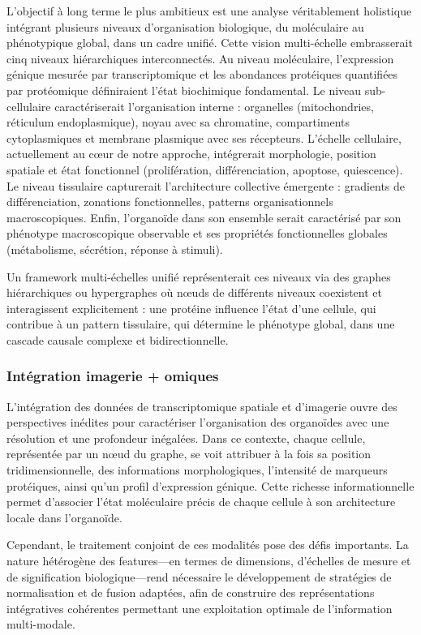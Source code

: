 L'objectif à long terme le plus ambitieux est une analyse véritablement holistique intégrant plusieurs niveaux d'organisation biologique, du moléculaire au phénotypique global, dans un cadre unifié. Cette vision multi-échelle embrasserait cinq niveaux hiérarchiques interconnectés. Au niveau moléculaire, l'expression génique mesurée par transcriptomique et les abondances protéiques quantifiées par protéomique définiraient l'état biochimique fondamental. Le niveau sub-cellulaire caractériserait l'organisation interne : organelles (mitochondries, réticulum endoplasmique), noyau avec sa chromatine, compartiments cytoplasmiques et membrane plasmique avec ses récepteurs. L'échelle cellulaire, actuellement au cœur de notre approche, intégrerait morphologie, position spatiale et état fonctionnel (prolifération, différenciation, apoptose, quiescence). Le niveau tissulaire capturerait l'architecture collective émergente : gradients de différenciation, zonations fonctionnelles, patterns organisationnels macroscopiques. Enfin, l'organoïde dans son ensemble serait caractérisé par son phénotype macroscopique observable et ses propriétés fonctionnelles globales (métabolisme, sécrétion, réponse à stimuli).

Un framework multi-échelles unifié représenterait ces niveaux via des graphes hiérarchiques ou hypergraphes où nœuds de différents niveaux coexistent et interagissent explicitement : une protéine influence l'état d'une cellule, qui contribue à un pattern tissulaire, qui détermine le phénotype global, dans une cascade causale complexe et bidirectionnelle.

\subsubsection{Intégration imagerie + omiques}

L'intégration des données de transcriptomique spatiale et d'imagerie ouvre des perspectives inédites pour caractériser l'organisation des organoïdes avec une résolution et une profondeur inégalées. Dans ce contexte, chaque cellule, représentée par un nœud du graphe, se voit attribuer à la fois sa position tridimensionnelle, des informations morphologiques, l'intensité de marqueurs protéiques, ainsi qu'un profil d'expression génique. Cette richesse informationnelle permet d'associer l'état moléculaire précis de chaque cellule à son architecture locale dans l'organoïde.

Cependant, le traitement conjoint de ces modalités pose des défis importants. La nature hétérogène des features—en termes de dimensions, d'échelles de mesure et de signification biologique—rend nécessaire le développement de stratégies de normalisation et de fusion adaptées, afin de construire des représentations intégratives cohérentes permettant une exploitation optimale de l'information multi-modale.


